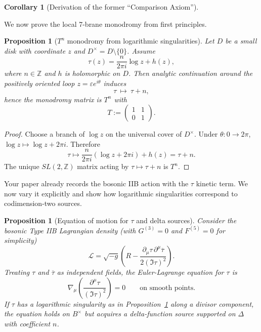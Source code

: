 \documentclass[11pt]{article}
\newtheorem{proposition}[theorem]{Proposition}
\newtheorem{corollary}[theorem]{Corollary}
\theoremstyle{remark}
\begin{document}
{\begin{corollary}[Derivation of the former      ``Comparison Axiom'']
\end{corollary}

We now prove the local 7-brane monodromy from first principles.

\begin{proposition}[$T^n$ monodromy from logarithmic singularities]
\label{prop:Tn}
Let $D$ be a small disk with coordinate $z$ and $D^{\times}=D\setminus\{0\}$.
Assume
\begin{equation}
\tau(z)=\frac{n}{2\pi i}\log z + h(z),
\end{equation}
where $n\in\mathbb{Z}$ and $h$ is holomorphic on $D$.
Then analytic continuation around the positively oriented loop $z=\varepsilon e^{i\theta}$ induces
\begin{equation}
\tau\ \longmapsto\ \tau+n,
\end{equation}
hence the monodromy matrix is $T^n$ with
\begin{equation}
T:=\begin{pmatrix}1&1\\0&1\end{pmatrix}.
\end{equation}
\end{proposition}

\begin{proof}
Choose a branch of $\log z$ on the universal cover of $D^{\times}$. Under $\theta:0\to 2\pi$,
$\log z\mapsto \log z + 2\pi i$. Therefore
\begin{equation}
\tau \mapsto \frac{n}{2\pi i}(\log z + 2\pi i) + h(z)=\tau+n.
\end{equation}
The unique $SL(2,\mathbb{Z})$ matrix acting by $\tau\mapsto \tau+n$ is $T^n$.
\end{proof}

Your paper already records the bosonic IIB action with the $\tau$ kinetic term.
We now vary it explicitly and show how logarithmic singularities correspond to codimension-two sources.

\begin{proposition}[Equation of motion for $\tau$ and delta sources]
\label{prop:EOMtau}
Consider the bosonic Type IIB Lagrangian density (with $G^{(3)}=0$ and $F^{(5)}=0$ for simplicity)
\begin{equation}
\mathcal{L} = \sqrt{-g}\left(R - \frac{\partial_\mu\tau\,\partial^\mu\overline{\tau}}{2(\Im\tau)^2}\right).
\end{equation}
Treating $\tau$ and $\overline{\tau}$ as independent fields, the Euler-Lagrange equation for $\tau$ is
\begin{equation}
\nabla_\mu\left(\frac{\partial^\mu \tau}{(\Im\tau)^2}\right)=0
\qquad\text{on smooth points.}
\end{equation}
If $\tau$ has a logarithmic singularity as in Proposition~\ref{prop:Tn} along a divisor component,
the equation holds on $B^{\times}$ but acquires a delta-function source supported on $\Delta$ with coefficient $n$.
\end{proposition}

}
\end{document}
